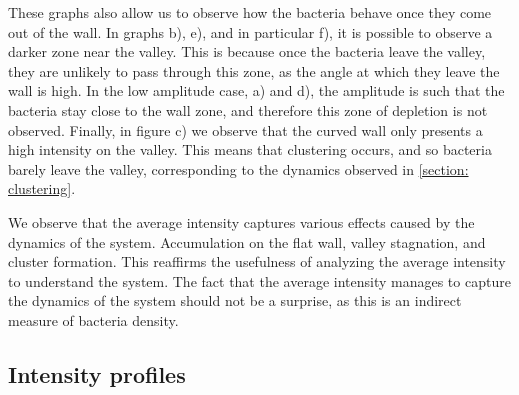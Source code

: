 These graphs also allow us to observe how the bacteria behave once they come out of the wall. In graphs b), e), and in particular f), it is possible to observe a darker zone near the valley. This is because once the bacteria leave the valley, they are unlikely to pass through this zone, as the angle at which they leave the wall is high. In the low amplitude case, a) and d), the amplitude is such that the bacteria stay close to the wall zone, and therefore this zone of depletion is not observed. Finally, in figure c) we observe that the curved wall only presents a high intensity on the valley. This means that clustering occurs, and so bacteria barely leave the valley, corresponding to the dynamics observed in \ref{section: clustering}. 

We observe that the average intensity captures various effects caused by the dynamics of the system. Accumulation on the flat wall, valley stagnation, and cluster formation. This reaffirms the usefulness of analyzing the average intensity to understand the system. The fact that the average intensity manages to capture the dynamics of the system should not be a surprise, as this is an indirect measure of bacteria density. 






\subsection{Intensity profiles}

